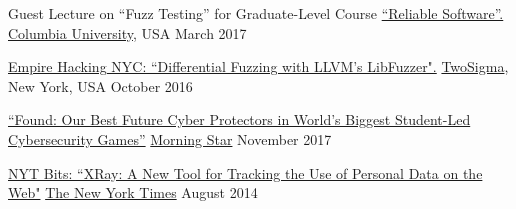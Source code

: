 \vspace{0.025in}
\begin{cvhonorswide2}
\cvhonorwide
    {}
    {Guest Lecture on ``Fuzz Testing'' for Graduate-Level Course \href{http://www.cs.columbia.edu/~junfeng/17sp-e6121/syllabus.html}{``Reliable Software''.}}
    {\href{http://www.cs.columbia.edu/}{Columbia University}, USA}
    {March 2017}
\end{cvhonorswide2}

\vspace{0.025in}
\begin{cvhonorswide2}
  \cvhonorwide
    {}
    {\href{https://www.meetup.com/Empire-Hacking/events/231863227/?_af=event&_af_eid=231863227&https=on}{Empire
            Hacking NYC: ``Differential Fuzzing with LLVM's LibFuzzer".}}
    {\href{https://www.twosigma.com/}{TwoSigma}, New York, USA}
    {October 2016}
\end{cvhonorswide2}

\vspace{0.025in}

\vspace{0.025in}
\begin{cvhonorswide2}
  \cvhonorwide
    {}
    {\href{https://www.morningstar.com/news/pr-news-wire/PRNews_20171114DC44382/found-our-best-future-cyber-protectors-in-worlds-biggest-studentled-cybersecurity-games.print.html}{\footnotesize``Found:
    Our Best Future Cyber Protectors
    in World's Biggest Student-Led Cybersecurity Games''}}
    {\href{https://www.morningstar.com}{Morning Star}}
    {November 2017}
\end{cvhonorswide2}
\vspace{0.025in}

\begin{cvhonorswide2}
  \cvhonorwide
    {}
    {\href{http://bits.blogs.nytimes.com/2014/08/18/xray-a-new-tool-for-tracking-the-use-of-personal-data-on-the-web/}{NYT Bits:
    ``XRay: A New Tool for Tracking the Use of Personal Data on the Web"}}
    {\href{http://www.nytimes.com/}{The New York Times}}
    {August 2014}
\end{cvhonorswide2}
